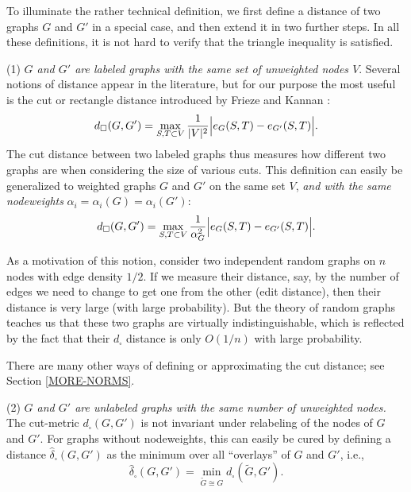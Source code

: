 \documentclass[12pt]{article}
\numberwithin{equation}{section}
\def\iv{\widehat}
\begin{document}
To illuminate the rather technical definition, we first define a
distance of two graphs $G$ and $G'$ in a special case, and then
extend it in two further steps. In all these definitions, it is not
hard to verify that the triangle inequality is satisfied.


\smallskip

(1) {\it $G$ and $G'$ are labeled graphs with the same set of unweighted nodes
$V$}. Several notions of distance appear in the literature, but for
our purpose the most useful is the cut or rectangle distance
introduced by Frieze and Kannan \cite{FK}:
\begin{equation}
\label{d-cut-unw-def} d_\square(G,G')=\max_{S,T\subset V} \frac
1{|V|^2}\Bigl|e_G(S,T)-e_{G'}(S,T)\Bigr|.
\end{equation}
The cut distance between two labeled graphs thus measures how
different two graphs are when considering the size of various cuts.
This definition can easily be generalized to weighted graphs $G$ and
$G'$ on the same set $V$, {\it and with the same nodeweights}
$\alpha_i=\alpha_i(G)=\alpha_i(G')$:
\begin{equation}\label{d-cut-w-def}
d_\square(G,G')=\max_{S,T\subset V}\frac1{\alpha_G^2}
\Bigl|e_G(S,T)-e_{G'}(S,T)\Bigr|.
\end{equation}

As a motivation of this notion, consider two independent random
graphs on $n$ nodes with edge density $1/2$. If we measure their
distance, say, by the number of edges we need to change to get one
from the other (edit distance), then their distance is very large
(with large probability). But the theory of random graphs
teaches us that these two graphs are virtually indistinguishable,
which is reflected by the fact that their $d_\square$ distance is
only $O(1/n)$ with large probability.

There are many other ways of defining or approximating the cut
distance; see Section \ref{MORE-NORMS}.

\smallskip

(2) {\it $G$ and $G'$ are unlabeled graphs with the same number of
unweighted nodes.} The cut-metric $d_\square(G,G')$ is not invariant
under relabeling of the nodes of $G$ and $G'$. For graphs without
nodeweights, this can easily be cured by defining a distance
$\iv\delta_\square(G,G')$ as the minimum over all ``overlays'' of
$G$ and $G'$, i.e.,
\begin{equation}
\label{delta-hat}
\iv\delta_\square(G,G')=\min_{\widetilde G \cong G}d_\square(\widetilde
G,G').
\end{equation}
\end{document}
